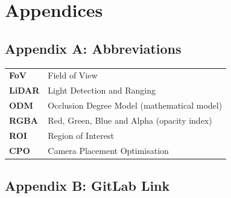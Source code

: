 \chapter*{Appendices}
\label{appendices}
{}
\section*{Appendix A: Abbreviations}
\begin{center}
\begin{tabular}{ll}
\textbf{FoV}	&	Field of View\\
\textbf{LiDAR}	&	Light Detection and Ranging\\
\textbf{ODM}	&	Occlusion Degree Model (mathematical model)\\
\textbf{RGBA}	&	Red, Green, Blue and Alpha (opacity index)\\
\textbf{ROI}	&	Region of Interest\\
\textbf{CPO}	&	Camera Placement Optimisation\\
\end{tabular}
\end{center}

\newpage
{}
\section*{Appendix B: GitLab Link}

